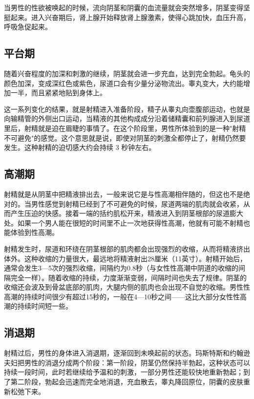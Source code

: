 当男性的性欲被唤起的时候，流向阴茎和阴囊的血流量就会突然增多，阴茎变得坚挺起来。进入兴奋期后，肾上腺开始释放肾上腺激素，使得心跳加快，血压升高，呼吸急促起来。

\subsection{平台期}

随着兴奋程度的加深和刺激的继续，阴茎就会进一步充血，达到完全勃起。龟头的颜色加深，变成深红色或紫色，尿道口会有少量分泌物流出。睾丸变大，大约能增加一半，而且紧紧地贴到身体上。

这一系列变化的结果，就是射精进入准备阶段，精子从睾丸向壶腹部运动，也就是向输精管的外侧出口运动，当精液的其他构成成分沿着储精囊和前列腺进入到尿道里后，射精就是迫在眉睫的事情了。在这个阶段里，男性所体验到的是一种"射精不可避免"的感觉。这个意思就是说，即使对阴茎的刺激全都停止了，射精仍然要发生。这种射精的迫切感大约会持续 3 秒钟左右。

\subsection{高潮期}

射精就是从阴茎中把精液排出去，一般来说它是与性高潮相伴随的，但这也不是绝对的。当男性感觉到射精已经到了不可避免的时候，尿道两端的肌肉就会收紧，从而产生压迫的快感。接着一端的括约肌松开来，精液进入到阴茎根部的尿道膨大处。如果一个男人能在很短的时间里不止一次地获得性高潮，他就有可能不射精也能体验到性高潮。

射精发生时，尿道和环绕在阴茎根部的肌肉都会出现强烈的收缩，从而将精液挤出体外。这种收缩的力量很大，最远地将精液射出28厘米（11英寸）。射精开始后，通常会发生3—5次的强烈收缩，间隔约为0.8秒（与女性性高潮中阴道的收缩的间隔完全一样）。随着收缩的持续，力度渐渐变弱，间隔时间也失去了规律。阴茎的收缩还会波及到骨盆底部的肌肉，大腿内侧的肌肉也会出现不自觉的收缩。男性性高潮的持续时间很少有超过15秒的，一般在4—10秒之间——这比大部分女性性高潮的持续时间短一些。

\subsection{消退期}

射精过后，男性的身体进入消退期，逐渐回到未唤起前的状态。玛斯特斯和约翰逊夫妇把男性的消退分成两个阶段：第一阶段，阴茎仍然保持半勃起，这种状态可以持续一段时间，此时若继续给予温和的刺激，一部分男性还能较快地重新勃起；到了第二阶段，勃起会迅速而完全地消退，充血散去，睾丸降回原位，阴囊的皮肤重新松弛下来。

